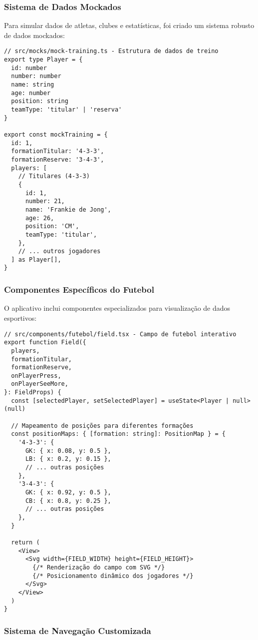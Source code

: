 \subsubsection{Sistema de Dados Mockados}

Para simular dados de atletas, clubes e estatísticas, foi criado um sistema robusto de dados mockados:

\begin{verbatim}
// src/mocks/mock-training.ts - Estrutura de dados de treino
export type Player = {
  id: number
  number: number
  name: string
  age: number
  position: string
  teamType: 'titular' | 'reserva'
}

export const mockTraining = {
  id: 1,
  formationTitular: '4-3-3',
  formationReserve: '3-4-3',
  players: [
    // Titulares (4-3-3)
    {
      id: 1,
      number: 21,
      name: 'Frankie de Jong',
      age: 26,
      position: 'CM',
      teamType: 'titular',
    },
    // ... outros jogadores
  ] as Player[],
}
\end{verbatim}

\subsubsection{Componentes Específicos do Futebol}

O aplicativo inclui componentes especializados para visualização de dados esportivos:

\begin{verbatim}
// src/components/futebol/field.tsx - Campo de futebol interativo
export function Field({
  players,
  formationTitular,
  formationReserve,
  onPlayerPress,
  onPlayerSeeMore,
}: FieldProps) {
  const [selectedPlayer, setSelectedPlayer] = useState<Player | null>(null)
  
  // Mapeamento de posições para diferentes formações
  const positionMaps: { [formation: string]: PositionMap } = {
    '4-3-3': {
      GK: { x: 0.08, y: 0.5 },
      LB: { x: 0.2, y: 0.15 },
      // ... outras posições
    },
    '3-4-3': {
      GK: { x: 0.92, y: 0.5 },
      CB: { x: 0.8, y: 0.25 },
      // ... outras posições
    },
  }
  
  return (
    <View>
      <Svg width={FIELD_WIDTH} height={FIELD_HEIGHT}>
        {/* Renderização do campo com SVG */}
        {/* Posicionamento dinâmico dos jogadores */}
      </Svg>
    </View>
  )
}
\end{verbatim}

\subsubsection{Sistema de Navegação Customizada}

